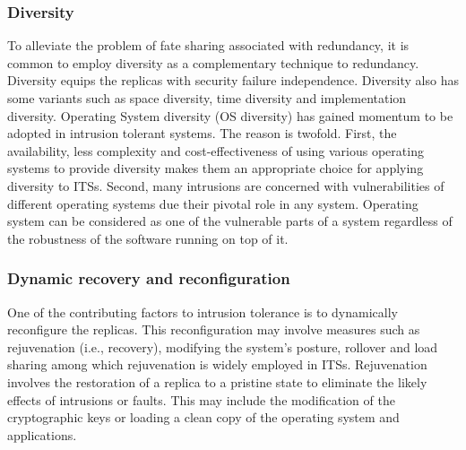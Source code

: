 \documentclass[preprint,number,12pt]{elsarticle}
\begin{document}
\subsubsection{Diversity}
To alleviate the problem of fate sharing associated with redundancy, it is common to employ diversity as a complementary technique to redundancy. Diversity equips the replicas with security failure independence. Diversity also has some variants such as space diversity, time diversity and implementation diversity. Operating System diversity (OS diversity) has gained momentum to be adopted in intrusion tolerant systems. The reason is twofold. First, the availability, less complexity and cost-effectiveness of using various operating systems to provide diversity makes them an appropriate choice for applying diversity to ITSs. Second, many intrusions are concerned with vulnerabilities of different operating systems due their pivotal role in any system\citep{Garcia2011a}. Operating system can be considered as one of the vulnerable parts of a system regardless of the robustness of the software running on top of it\citep{Obelheiro2006}.
\subsubsection{Dynamic recovery and reconfiguration}
One of the contributing factors to intrusion tolerance is to dynamically reconfigure the replicas. This reconfiguration may involve measures such as rejuvenation (i.e., recovery), modifying the system's posture, rollover and load sharing among which rejuvenation is widely employed in ITSs. Rejuvenation involves the restoration of a replica to a pristine state to eliminate the likely effects of intrusions or faults\citep{Wang2003b}. This may include the modification of the cryptographic keys or loading a clean copy of the operating system and applications\citep{Sousa2010}.
\end{document}
